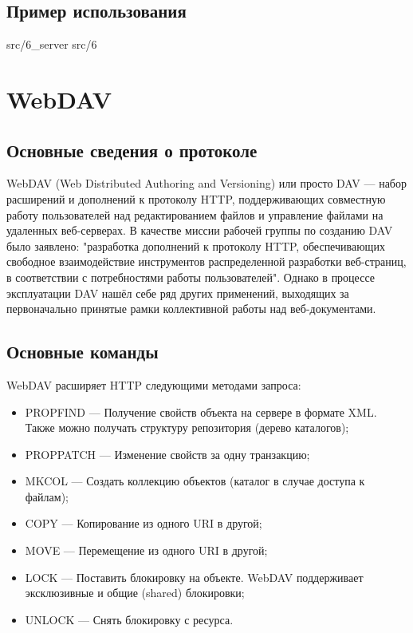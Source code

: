 \subsection{Пример использования}
 {src/6_server}
 {src/6}

\section{WebDAV}

\subsection{Основные сведения о протоколе}
WebDAV (Web Distributed Authoring and Versioning) или просто DAV — набор расширений и дополнений к протоколу HTTP, поддерживающих совместную работу пользователей над редактированием файлов и управление файлами на удаленных веб-серверах. В качестве миссии рабочей группы по созданию DAV было заявлено: "разработка дополнений к протоколу HTTP, обеспечивающих свободное взаимодействие инструментов распределенной разработки веб-страниц, в соответствии с потребностями работы пользователей". Однако в процессе эксплуатации DAV нашёл себе ряд других применений, выходящих за первоначально принятые рамки коллективной работы над веб-документами.

\subsection{Основные команды}
WebDAV расширяет HTTP следующими методами запроса:
\begin{itemize}
\item PROPFIND — Получение свойств объекта на сервере в формате XML. Также можно получать структуру репозитория (дерево каталогов);
\item PROPPATCH — Изменение свойств за одну транзакцию;
\item MKCOL — Создать коллекцию объектов (каталог в случае доступа к файлам);
\item COPY — Копирование из одного URI в другой;
\item MOVE — Перемещение из одного URI в другой;
\item LOCK — Поставить блокировку на объекте. WebDAV поддерживает эксклюзивные и общие (shared) блокировки;
\item UNLOCK — Снять блокировку с ресурса.
\end{itemize}
   
